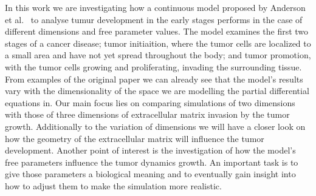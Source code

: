 In this work we are investigating how a continuous model proposed by Anderson et al.~\cite{anderson_continuous_1998,anderson_mathematical_2000} to analyse tumur development in the early stages performs in the case of different dimensions and free parameter values. The model examines the first two stages of a cancer disease; tumor initiaition, where the tumor cells are localized to a small area and have not yet spread throughout the body; and tumor promotion, with the tumor cells growing and proliferating, invading the surrounding tissue. From examples of the original paper we can already see that the model's results vary with the dimensionality of the space we are modelling the partial differential equations in. Our main focus lies on comparing simulations of two dimensions with those of three dimensions of extracellular matrix invasion by the tumor growth. Additionally to the variation of dimensions we will have a closer look on how the geometry of the extracellular matrix will influence the tumor development. \newline 
Another point of interest is the investigation of how the model's free parameters influence the tumor dynamics growth. An important task is to give those parameters a biological meaning and to eventually gain insight into how to adjust them to make the simulation more realistic.